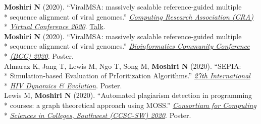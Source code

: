 \documentclass[margin,line]{res}
\begin{document}
\begin{resume}
\hspace*{4mm} \textbf{Moshiri N} (2020). ``ViralMSA: massively scalable reference-guided multiple\\*
\hspace*{9mm} sequence alignment of viral genomes.'' \href{https://cra.org/events/cra-virtual-conference-2020/}{\textit{Computing Research Association (CRA)}}\\*\vspace{2mm}
\hspace*{8mm} \href{https://cra.org/events/cra-virtual-conference-2020/}{\textit{Virtual Conference 2020}}. \href{https://www.youtube.com/watch?v=PrAoks7OhE8&list=PL6AeXx75lHyyqKgfRmlSM4QUEna0dWDza&index=9&t=0s}{Talk}.\\
\hspace*{4mm} \textbf{Moshiri N} (2020). ``ViralMSA: massively scalable reference-guided multiple\\*
\hspace*{9mm} sequence alignment of viral genomes.'' \href{https://bcc2020.github.io/}{\textit{Bioinformatics Community Conference}}\\*\vspace{2mm}
\hspace*{8mm} \href{https://bcc2020.github.io/}{\textit{(BCC) 2020}}. Poster.\\
\hspace*{4mm} Almaraz K, Jang T, Lewis M, Ngo T, Song M, \textbf{Moshiri N} (2020). ``SEPIA:\\*
\hspace*{9mm} Simulation-based Evaluation of PrIoritization Algorithms.'' \href{https://cme.ucsd.edu/hivdynamics/}{\textit{27th International}}\\*\vspace{2mm}
\hspace*{8mm} \href{https://cme.ucsd.edu/hivdynamics/}{\textit{HIV Dynamics \& Evolution}}. Poster.\\
\hspace*{4mm} Lewis M, \textbf{Moshiri N} (2020). ``Automated plagiarism detection in programming\\*
\hspace*{9mm} courses: a graph theoretical approach using MOSS.'' \href{http://ccsc.org/southwestern/2020/index.php}{\textit{Consortium for Computing}}\\*\vspace{2mm}
\hspace*{8mm} \href{http://ccsc.org/southwestern/2020/index.php}{\textit{Sciences in Colleges, Southwest (CCSC-SW) 2020}}. Poster.\\

\end{resume}
\end{document}
